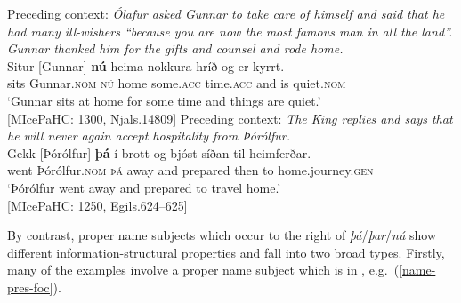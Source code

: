 \documentclass[output=paper,colorlinks,citecolor=brown]{langscibook}
\begin{document}
\ea 
\ea  \label{name-cont-top}
    Preceding context: \textit{Ólafur asked Gunnar to take care of himself and said that he had many ill-wishers ``because you are now the most famous man in all the land''. Gunnar thanked him for the gifts and counsel and rode home.}\\
    \gll Situr [Gunnar] \textbf{nú} heima nokkura hríð og er kyrrt.\\
    sits Gunnar.\textsc{nom} \textsc{nú} home some.\textsc{acc} time.\textsc{acc} and is quiet.\textsc{nom}\\
   \glt  `Gunnar sits at home for some time and things are quiet.' \\ \hfill [MIcePaHC: 1300, Njals.14809]
\ex \label{name-shift-top}
    Preceding context: \textit{The King replies and says that he will never again accept hospitality from Þórólfur.}\\
    \gll Gekk [Þórólfur] \textbf{þá} {í brott} og bjóst síðan til heimferðar.\\
    went Þórólfur.\textsc{nom} \textsc{þá} away and prepared then to home.journey.\textsc{gen}\\
    \glt `Þórólfur went away and prepared to travel home.'\\ \hfill [MIcePaHC: 1250, Egils.624--625]
\z 
\z 

By contrast, proper name subjects which occur to the right of \textit{þá}/\textit{þar}/\textit{nú} show different information-structural properties and fall into two broad types. Firstly, many of the examples involve a proper name subject which is in , e.g.~(\ref{name-pres-foc}).
\end{document}
